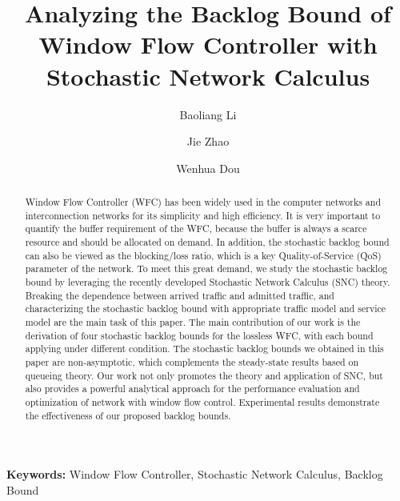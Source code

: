 \documentclass[12pt]{article}
\title{Analyzing the Backlog Bound of Window Flow Controller with Stochastic Network Calculus}
\date{}
\author[a]{Baoliang Li}
\author[b]{Jie Zhao}
\author[a]{Wenhua Dou}
\affil[a]{College of Computer, National University of Defense Technology}
\affil[b]{State Key Laboratory of Mathematical Engineering and Advanced Computing}
\begin{document}
\maketitle
\begin{abstract}
Window Flow Controller (WFC) has been widely used in the computer networks and interconnection networks for its simplicity and high efficiency. It is very important to quantify the buffer requirement of the WFC, because the buffer is always a scarce resource and should be allocated on demand. In addition, the stochastic backlog bound can also be viewed as the blocking/loss ratio, which is a key Quality-of-Service (QoS) parameter of the network. To meet this great demand, we study the stochastic backlog bound by leveraging the recently developed Stochastic Network Calculus (SNC) theory. Breaking the dependence between arrived traffic and admitted traffic, and characterizing the stochastic backlog bound with appropriate traffic model and service model are the main task of this paper. The main contribution of our work is the derivation of four stochastic backlog bounds for the lossless WFC, with each bound applying under different condition. The stochastic backlog bounds we obtained in this paper are non-asymptotic, which complements the steady-state results based on queueing theory. Our work not only promotes the theory and application of SNC, but also provides a powerful analytical approach for the performance evaluation and optimization of network with window flow control. Experimental results demonstrate the effectiveness of our proposed backlog bounds.
\end{abstract}

{\bf Keywords:} Window Flow Controller, Stochastic Network Calculus, Backlog Bound
\end{document}
